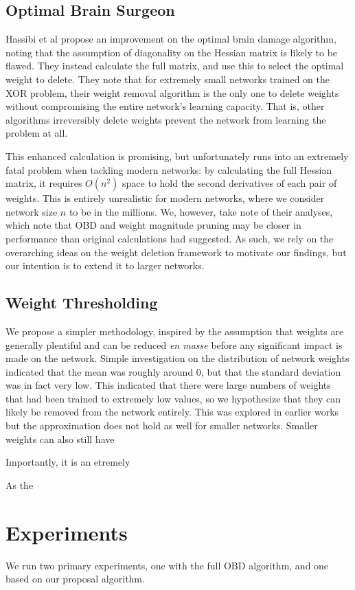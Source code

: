 \documentclass[10pt,twocolumn,letterpaper]{article}
\begin{document}
\subsection{Optimal Brain Surgeon}
Hassibi et al \cite{hassibi1993optimal, hassibi1994optimal} propose an improvement on the optimal brain damage algorithm, noting that the assumption of diagonality on the Hessian matrix is likely to be flawed.
They instead calculate the full matrix, and use this to select the optimal weight to delete.
They note that for extremely small networks trained on the XOR problem, their weight removal algorithm is the only one to delete weights without compromising the entire network's learning capacity.
That is, other algorithms irreversibly delete weights prevent the network from learning the problem at all.

This enhanced calculation is promising, but unfortunately runs into an extremely fatal problem when tackling modern networks: by calculating the full Hessian matrix, it requires $O(n^2)$ space to hold the second derivatives of each pair of weights.
This is entirely unrealistic for modern networks, where we consider network size $n$ to be in the millions.
We, however, take note of their analyses, which note that OBD and weight magnitude pruning may be closer in performance than original calculations had suggested.
As such, we rely on the overarching ideas on the weight deletion framework to motivate our findings, but our intention is to extend it to larger networks.
\subsection{Weight Thresholding}
We propose a simpler methodology, inspired by the assumption that weights are generally plentiful and can be reduced \emph{en masse} before any significant impact is made on the network.
Simple investigation on the distribution of network weights indicated that the mean was roughly around 0, but that the standard deviation was in fact very low.
This indicated that there were large numbers of weights that had been trained to extremely low values, so we hypothesize that they can likely be removed from the network entirely.
This was explored in earlier works but the approximation does not hold as well for smaller networks.
Smaller weights can also still have 

Importantly, it is an etremely

As the 
\section{Experiments}
We run two primary experiments, one with the full OBD algorithm, and one based on our proposal algorithm.
\end{document}
